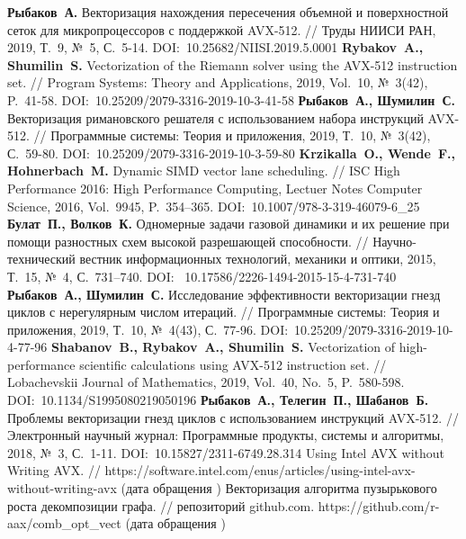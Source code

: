 \begin{thebibliography}{99}
\textbf{Рыбаков~А.} Векторизация нахождения пересечения объемной и поверхностной сеток для микропроцессоров с поддержкой AVX-512. // Труды НИИСИ РАН, 2019, Т.~9, №~5, С.~5-14. DOI:~10.25682/NIISI.2019.5.0001
\textbf{Rybakov~A., Shumilin~S.} Vectorization of the Riemann solver using the AVX-512 instruction set. // Program Systems: Theory and Applications, 2019, Vol.~10, №~3(42), P.~41-58. DOI:~10.25209/2079-3316-2019-10-3-41-58
\textbf{Рыбаков~А., Шумилин~С.} Векторизация римановского решателя с использованием набора инструкций AVX-512. // Программные системы: Теория и приложения, 2019, Т.~10, №~3(42), С.~59-80. DOI:~10.25209/2079-3316-2019-10-3-59-80
\textbf{Krzikalla~O., Wende~F., Hohnerbach~M.} Dynamic SIMD vector lane scheduling. // ISC High Performance 2016: High Performance Computing, Lectuer Notes Computer Science, 2016, Vol.~9945, P.~354–365. DOI:~10.1007/978-3-319-46079-6\_25
\textbf{Булат~П., Волков~К.} Одномерные задачи газовой динамики и их решение при помощи разностных схем высокой разрешающей способности. // Научно-технический вестник информационных технологий, механики и оптики, 2015, Т.~15, №~4, С.~731–740. DOI:~ 10.17586/2226-1494-2015-15-4-731-740
\textbf{Рыбаков~А., Шумилин~С.} Исследование эффективности векторизации гнезд циклов с нерегулярным числом итераций. // Программные системы: Теория и приложения, 2019, Т.~10, №~4(43), С.~77-96. DOI:~10.25209/2079-3316-2019-10-4-77-96
\textbf{Shabanov~B., Rybakov~A., Shumilin~S.} Vectorization of high-performance scientific calculations using AVX-512 instruction set. // Lobachevskii Journal of Mathematics, 2019, Vol.~40, No.~5, P.~580-598. DOI:~10.1134/S1995080219050196
\textbf{Рыбаков~А., Телегин~П., Шабанов~Б.} Проблемы векторизации гнезд циклов с использованием инструкций AVX-512. // Электронный научный журнал: Программные продукты, системы и алгоритмы, 2018, №~3, С.~1-11. DOI:~10.15827/2311-6749.28.314
Using Intel AVX without Writing AVX. // https://software.intel.com/enus/articles/using-intel-avx-without-writing-avx (дата обращения \StrDate)
Векторизация алгоритма пузырькового роста декомпозиции графа. // репозиторий github.com. https://github.com/r-aax/comb\_opt\_vect (дата обращения \StrDate)


\end{thebibliography}